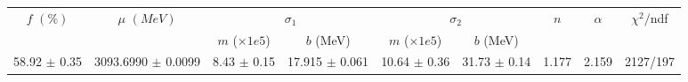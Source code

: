 \begin{tabular}{c|c|cc|cc|c|c||c}
 \multirow{2}{*}{$f$ $(\%)$} & \multirow{2}{*}{$\mu$ $(MeV)$} & \multicolumn{2}{|c|}{$\sigma_1$} & \multicolumn{2}{|c|}{$\sigma_2$}  & \multirow{2}{*}{$n$} & \multirow{2}{*}{$\alpha$} & \multirow{2}{*}{$\chi^2/$ndf} \\
 & & $m$ ($\times1e5$) & $b$ (MeV) & $m$ ($\times1e5$) & $b$ (MeV) & & & \\
\hline
58.92 $\pm$ 0.35 & 3093.6990 $\pm$ 0.0099 & 8.43 $\pm$ 0.15 & 17.915 $\pm$ 0.061 & 10.64 $\pm$ 0.36 & 31.73 $\pm$ 0.14 & 1.177 & 2.159 & 2127/197\\
\end{tabular}
